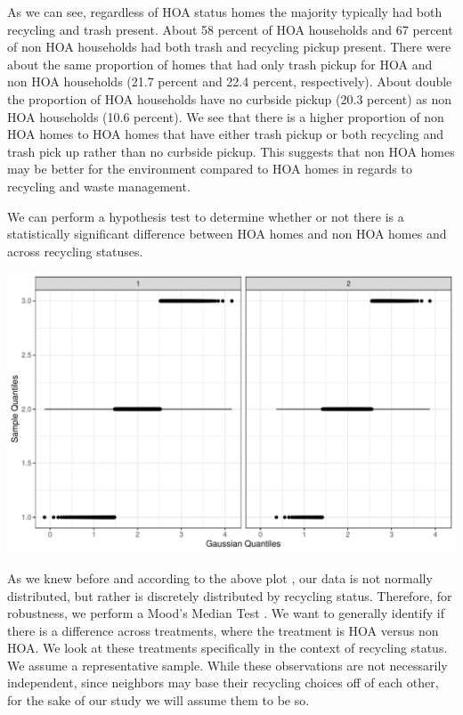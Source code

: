 \documentclass{article}
\begin{document}
As we can see, regardless of HOA status homes the majority typically had both recycling and trash present. About 58 percent of HOA households and 67 percent of non HOA households had both trash and recycling pickup present. There were about the same proportion of homes that had only trash pickup for HOA and non HOA households (21.7 percent and 22.4 percent, respectively). About double the proportion of HOA households have no curbside pickup (20.3 percent) as non HOA households (10.6 percent). We see that there is a higher proportion of non HOA homes to HOA homes that have either trash pickup or both recycling and trash pick up rather than no curbside pickup. This suggests that non HOA homes may be better for the environment compared to HOA homes in regards to recycling and waste management.

We can perform a hypothesis test to determine whether or not there is a statistically significant difference between HOA homes and non HOA homes and across recycling statuses. 

\includegraphics{part2-011}

As we knew before and according to the above plot \citep{qqplotr}, our data is not normally distributed, but rather is discretely distributed by recycling status. Therefore, for robustness, we perform a Mood's Median Test \citep{RVAideMemoire}. We want to generally identify if there is a difference across treatments, where the treatment is HOA versus non HOA. We look at these treatments specifically in the context of recycling status. We assume a representative sample. While these observations are not necessarily independent, since neighbors may base their recycling choices off of each other, for the sake of our study we will assume them to be so.
\end{document}
